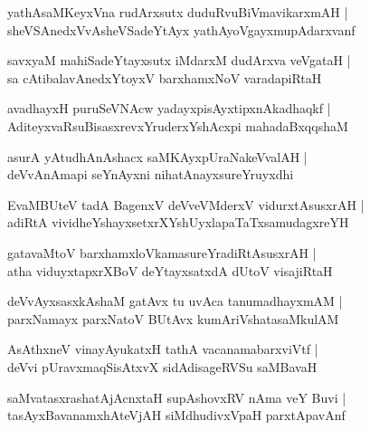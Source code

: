 \begin{shloka}
yathAsaMKeyxVna rudArxsutx duduRvuBiVmavikarxmAH |\\
sheVSAnedxVvA\R sheVSadeYtAyx yathAyoVgayxmupAdarxvanf
\end{shloka}

\begin{shloka}
savxyaM mahiSadeYtayxsutx iMdarxM dudArxva veVgataH |\\
sa cAtibalavAnedxYtoyxV barxhamxNoV varadapiRtaH 
\end{shloka}

\begin{shloka}
avadhayxH puruSeVNAcw yadayxpisAyxtipxnAkadhaqkf |\\
AditeyxvaRsuBisasxrevxYruderxYshAcxpi mahadaBxqqshaM 
\end{shloka}

\begin{shloka}
asurA yAtudhAnAshacx saMKAyxpUraNakeVvalAH |\\
deVvAnAmapi seYnAyxni nihatAnayxsureYruyxdhi
\end{shloka}

\begin{shloka}
EvaMBUteV tadA BagenxV deVveVMderxV vidurxtAsusxrAH |\\
adiRtA vividheYshayxsetxrXYshUyxlapaTaTxsamudagxreYH 
\end{shloka}

\begin{shloka}
gatavaMtoV barxhamxloVkamasureYradiRtAsusxrAH |\\
atha viduyxtapxrXBoV deYtayxsatxdA dUtoV visajiRtaH
\end{shloka}

\begin{shloka}
deVvAyxsasxkAshaM gatAvx tu uvAca tanumadhayxmAM |\\
parxNamayx parxNatoV BUtAvx kumAriVshatasaMkulAM 
\end{shloka}

\begin{shloka}
AsAthxneV vinayAyukatxH tathA vacanamabarxviVtf |\\
deVvi pUravxmaqSisAtxvX sidAdisageRVSu saMBavaH 
\end{shloka}

\begin{shloka}
saMvatasxrashatAjAcnxtaH supAshovxRV nAma veY Buvi |\\
tasAyxBavanamxhAteVjAH siMdhudivxVpaH parxtApavAnf 
\end{shloka}

